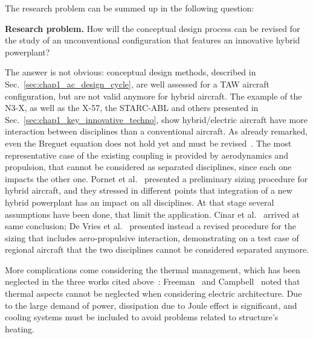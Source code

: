 The research problem can be summed up in the following question: 
\begin{mdframed}[hidealllines=true,backgroundcolor=green!20]
	\textbf{Research problem.} How will the conceptual design process can be revised for the study of an unconventional configuration that features an innovative hybrid powerplant?
\end{mdframed}
The answer is not obvious: conceptual design methods, described in Sec.~\ref{sec:chap1_ac_design_cycle}, are well assessed for a TAW aircraft configuration, but are not valid anymore for hybrid aircraft. 
The example of the N3-X, as well as the X-57, the STARC-ABL and others presented in Sec.~\ref{sec:chap1_key_innovative_techno}, show hybrid/electric aircraft have more interaction between disciplines than a conventional aircraft. 
As already remarked, even the Breguet equation does not hold yet and must be revised~\cite{bib:hepperle, bib:marwa}. 
The most representative case of the existing coupling is provided by aerodynamics and propulsion, that cannot be considered as separated disciplines, since each one impacts the other one. 
Pornet et al.~\cite{bib:pornet, bib:pornet_2014} presented a preliminary sizing procedure for hybrid aircraft, and they stressed in different points that integration of a new hybrid powerplant has an impact on all disciplines.
At that stage several assumptions have been done, that limit the application.  
Cinar et al.~\cite{bib:cinar_sizing} arrived at same conclusion; De Vries et al.~\cite{bib:devries_2018} presented instead a revised procedure for the sizing that includes aero-propulsive interaction, demonstrating on a test case of regional aircraft that the two disciplines cannot be considered separated anymore. 

More complications come considering the thermal management, which has been neglected in the three works cited above~\Cite{bib:pornet, bib:cinar_sizing, bib:devries_2018}: Freeman~\cite{bib:freeman} and Campbell~\cite{bib:campbell_prop} noted that thermal aspects cannot be neglected when considering electric architecture. 
Due to the large demand of power, dissipation due to Joule effect is significant, and cooling systems must be included to avoid problems related to structure's heating. 

